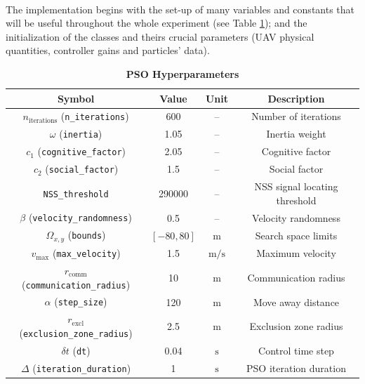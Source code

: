\documentclass[main]{subfiles}
\begin{document}
\noindent\\
The implementation begins with the set-up of 
many variables and constants that will be useful throughout 
the whole experiment (see Table \ref{tab:pso_parameters}); and the initialization of the classes and theirs
crucial parameters (UAV physical quantities, controller gains and 
particles' data).
\begin{table}
\centering
\caption{\textbf{PSO Hyperparameters}}
\begin{tabular}{c c c c}
\hline\hline
\textbf{Symbol}              & \textbf{Value}        & \textbf{Unit}           & \textbf{Description}      \\ \hline\hline                   
\(n_{\text{iterations}}\) (\texttt{n\_iterations})     & 600                   & --                      & Number of iterations      \\
\(\omega\) (\texttt{inertia})                          & 1.05                  & --                      & Inertia weight            \\
\(c_1\) (\texttt{cognitive\_factor})                   & 2.05                  & --                      & Cognitive factor          \\
\(c_2\) (\texttt{social\_factor})                      & 1.5                   & --                      & Social factor             \\
 \texttt{NSS\_threshold}                               & 290000                & --                      & NSS signal locating threshold\\
\(\beta\) (\texttt{velocity\_randomness})              & 0.5                   & --                      & Velocity randomness       \\ \hline
\(\Omega_{x,y}\) (\texttt{bounds})                     & \([-80, 80]\)         & \(\text{m}\)            & Search space limits       \\
\(v_{\text{max}}\) (\texttt{max\_velocity})            & 1.5                   & \(\text{m/s}\)          & Maximum velocity          \\                
\(r_{\text{comm}}\) (\texttt{communication\_radius})   & 10                    & \(\text{m}\)           & Communication radius      \\
\(\alpha\) (\texttt{step\_size})                       & 120                   & \(\text{m}\)           & Move away distance        \\
\(r_{\text{excl}}\) (\texttt{exclusion\_zone\_radius}) & 2.5                   & \(\text{m}\)           & Exclusion zone radius     \\
\(\delta t\) (\texttt{dt})                             & 0.04                  & \(\text{s}\)           & Control time step         \\
\(\Delta\) (\texttt{iteration\_duration})              & 1                     & \(\text{s}\)           & PSO iteration duration    \\
\hline\hline
\end{tabular}
\label{tab:pso_parameters}
\end{table}
\end{document}
